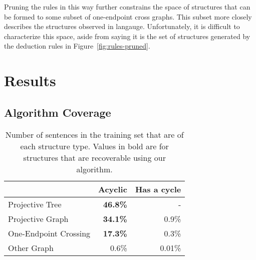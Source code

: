 Pruning the rules in this way further constrains the space of structures that can be formed to some subset of one-endpoint cross graphs.
This subset more closely describes the structures observed in langauge.
Unfortunately, it is difficult to characterize this space, aside from saying it is the set of structures generated by the deduction rules in Figure~\ref{fig:rules-pruned}.






\section{Results}

\subsection{Algorithm Coverage}

\begin{table}
  \centering
  \begin{tabular}{|lrr|}
    \hline
      & Acyclic & Has a cycle \\
    \hline
    \hline
    Projective Tree & \textbf{46.8\%} & - \\
    Projective Graph & \textbf{34.1\%} & 0.9\% \\
    One-Endpoint Crossing & \textbf{17.3\%} & 0.3\% \\
    Other Graph & 0.6\% & 0.01\% \\
    \hline
  \end{tabular}
  \caption[Number of sentences in the training set that are of each structure type.]{ \label{tab:structures}
    Number of sentences in the training set that are of each structure type.
    Values in bold are for structures that are recoverable using our algorithm.
  }
\end{table}

